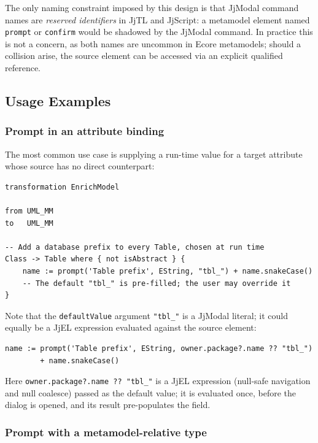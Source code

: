 \documentclass[11pt,a4paper]{article}
\newcommand{\jjmodal}{\textsf{JjModal}}
\newcommand{\jjel}{\textsf{JjEL}}
\newcommand{\jjtl}{\textsf{JjTL}}
\begin{document}
The only naming constraint imposed by this design is that \jjmodal{}
command names are \emph{reserved identifiers} in \jjtl{} and
\textsf{JjScript}: a metamodel element named \texttt{prompt} or
\texttt{confirm} would be shadowed by the \jjmodal{} command. In
practice this is not a concern, as both names are uncommon in Ecore
metamodels; should a collision arise, the source element can be accessed
via an explicit qualified reference.
 
\subsection{Usage Examples}
 
\subsubsection{Prompt in an attribute binding}
 
The most common use case is supplying a run-time value for a target
attribute whose source has no direct counterpart:
 
\begin{lstlisting}[style=jjtl,caption={JjModal prompt in a JjTL binding}]
transformation EnrichModel
 
from UML_MM
to   UML_MM
 
-- Add a database prefix to every Table, chosen at run time
Class -> Table where { not isAbstract } {
    name := prompt('Table prefix', EString, "tbl_") + name.snakeCase()
    -- The default "tbl_" is pre-filled; the user may override it
}
\end{lstlisting}
 
Note that the \texttt{defaultValue} argument \texttt{"tbl\_"} is a
\jjmodal{} literal; it could equally be a \jjel{} expression evaluated
against the source element:
 
\begin{lstlisting}[style=jjtl,numbers=none]
name := prompt('Table prefix', EString, owner.package?.name ?? "tbl_")
        + name.snakeCase()
\end{lstlisting}
 
Here \texttt{owner.package?.name ?? "tbl\_"} is a \jjel{} expression
(null-safe navigation and null coalesce) passed as the default value;
it is evaluated once, before the dialog is opened, and its result
pre-populates the field.
 
\subsubsection{Prompt with a metamodel-relative type}
 
\end{document}
